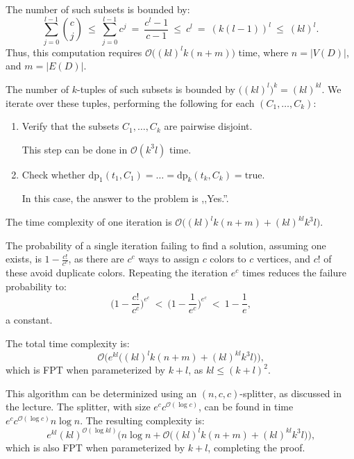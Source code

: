 \documentclass[12pt]{article}
\begin{document}
	\medskip
	
	The number of such subsets is bounded by:
	\[ \sum\limits_{j = 0}^{l - 1} \binom{c}{j} \ \leqslant \
	\sum\limits_{j = 0}^{l - 1} c^{j} \ = \ \frac{c^{l} - 1}{c - 1} \ \leqslant
	\ c^{l} \ = \ (k (l - 1))^{l} \ \leqslant \ (kl)^{l} \text{.} \]
	Thus, this computation requires \(\mathcal{O} \big( (kl)^{l} k (n + m)
	\big)\) time, where \(n = |V(D)|\), and \(m = |E(D)|\).
	
	\medskip
	
	The number of \(k\)-tuples of such subsets is bounded by \(\big( (kl)^l
	\big)^{k} = (kl)^{kl}\). We iterate over these tuples, performing the
	following for each \((C_{1}, \ldots, C_{k})\):
	\begin{enumerate}
		\item Verify that the subsets \(C_{1}, \ldots, C_{k}\) are pairwise
		      disjoint.
		      
		      This step can be done in \(\mathcal{O}(k^{3} l)\) time.
		
		\item Check whether \(\text{dp}_{1}(t_{1}, C_{1}) = \ldots =
		      \text{dp}_{k}(t_{k}, C_{k}) = \text{true}\).
		      
		      In this case, the answer to the problem is ,,Yes.''.
	\end{enumerate}
	The time complexity of one iteration is \(\mathcal{O} \big( (kl)^l k (n + m)
	+ (kl)^{kl} k^{3} l \big)\).
	
	\medskip
	
	The probability of a single iteration failing to find a solution, assuming
	one exists, is \(1 - \frac{c!}{c^{c}}\), as there are \(c^{c}\) ways to
	assign \(c\) colors to \(c\) vertices, and \(c!\) of these avoid duplicate
	colors. Repeating the iteration \(e^{c}\) times reduces the failure
	probability to:
	\[ \bigg( 1 - \frac{c!}{c^{c}} \bigg)^{e^{c}} \ < \ \bigg( 1 -
	\frac{1}{e^{c}} \bigg)^{e^{c}} \ < \ 1 - \frac{1}{e} \text{,} \]
	a constant.
	
	\medskip
	
	The total time complexity is:
	\[ \mathcal{O} \big( e^{kl} \big( (kl)^l k (n + m) + (kl)^{kl} k^{3} l \big)
	\big) \text{,} \]
	which is FPT when parameterized by \(k + l\), as \(kl \leqslant
	(k + l)^{2}\).
	
	\medskip
	
	This algorithm can be determinized using an \((n, c, c)\)-splitter, as
	discussed in the lecture. The splitter, with size \(e^{c}
	c^{\mathcal{O}(\log c)}\), can be found in time \(e^{c}
	c^{\mathcal{O}(\log c)} n \log n\). The resulting complexity is:
	\[ e^{kl} (kl)^{\mathcal{O}(\log kl)} \big( n \log n + \mathcal{O} \big(
	(kl)^l k (n + m) + (kl)^{kl} k^{3} l \big) \big) \text{,} \]
	which is also FPT when parameterized by \(k + l\), completing the proof.
\end{document}
